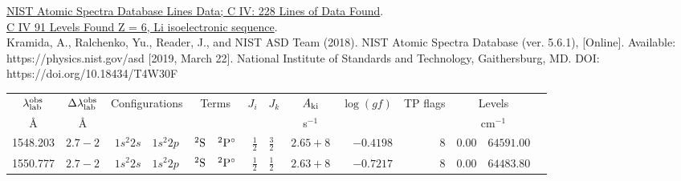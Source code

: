 \documentclass[a4paper,fleqn,usenatbib]{mnras}
\begin{document}
\href{https://physics.nist.gov/cgi-bin/ASD/lines1.pl?spectra=C+IV&limits_type=0&low_w=&upp_w=&unit=1&submit=Retrieve+Data&de=0&format=0&line_out=0&en_unit=0&output=0&bibrefs=1&page_size=15&show_obs_wl=1&show_calc_wl=1&unc_out=1&order_out=0&max_low_enrg=&show_av=2&max_upp_enrg=&tsb_value=0&min_str=&A_out=0&intens_out=on&max_str=&allowed_out=1&forbid_out=1&min_accur=&min_intens=&conf_out=on&term_out=on&enrg_out=on&J_out=on}{NIST Atomic Spectra Database Lines Data; C IV: 228 Lines of Data Found}. \\

\href{https://physics.nist.gov/cgi-bin/ASD/energy1.pl?encodedlist=XXT2&de=0&spectrum=C+IV&submit=Retrieve+Data&units=0&format=0&output=0&page_size=15&multiplet_ordered=0&conf_out=on&term_out=on&level_out=on&unc_out=1&j_out=on&lande_out=on&perc_out=on&biblio=on&temp=}{C IV   91 Levels Found
Z = 6, Li isoelectronic sequence}. \\

Kramida, A., Ralchenko, Yu., Reader, J., and NIST ASD Team (2018). NIST Atomic Spectra Database (ver. 5.6.1), [Online]. Available: https://physics.nist.gov/asd [2019, March 22]. National Institute of Standards and Technology, Gaithersburg, MD. DOI: https://doi.org/10.18434/T4W30F 





\begin{table*}
\begin{tabular}{rrr@{ -- }lr@{ -- }lr@{ -- }llrrr@{ -- }rl}
\hline
\multicolumn{1}{c}{$\lambda_{\rm lab}^{\rm obs}$} & \multicolumn{1}{c}{$\Delta\lambda_{\rm lab}^{\rm obs}$} & \multicolumn{2}{c}{Configurations} & \multicolumn{2}{c}{Terms} & $J_i$ & $J_k$ & \multicolumn{1}{c}{$A_{\rm ki}$} & \multicolumn{1}{c}{$\log(gf)$} & TP flags & \multicolumn{2}{c}{Levels}  \\
\multicolumn{1}{c}{\AA } & \multicolumn{1}{c}{\AA} & \multicolumn{2}{c}{} & \multicolumn{2}{c}{} & \multicolumn{2}{c}{} & \multicolumn{1}{c}{s$^{-1}$} & & & \multicolumn{2}{c}{cm$^{-1}$} & \\
\hline
   1548.203  & $2.7-2$ &  $1s^{2}2s$ & $1s^{2}2p$  &       $^{2}{\rm S}$ & $^{2}{\rm P}^\circ$ &  $\frac{1}{2}$ & $\frac{3}{2}$  & $2.65+8$ & $ -0.4198$ &     8 &      $0.00$ &  $64591.00$  \\
   1550.777  & $2.7-2$ &  $1s^{2}2s$ & $1s^{2}2p$  &       $^{2}{\rm S}$ & $^{2}{\rm P}^\circ$ &  $\frac{1}{2}$ & $\frac{1}{2}$  & $2.63+8$ & $ -0.7217$ &     8 &      $0.00$ &  $64483.80$  \\
\hline
\end{tabular}
\label{tab:civ_configs}
\end{table*}
\end{document}
